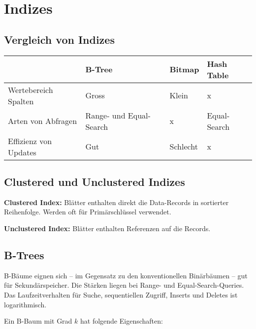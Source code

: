 \section{Indizes}


\subsection{Vergleich von Indizes}

\begin{tabular}{*4{l|}}
	\cline{2-4}
	& \textbf{B-Tree} & \textbf{Bitmap} & \textbf{Hash Table} \\
	\hline
	\multicolumn{1}{|l|}{Wertebereich Spalten} & Gross & Klein & x \\
	\multicolumn{1}{|l|}{Arten von Abfragen} & Range- und Equal-Search & x & Equal-Search \\
	\multicolumn{1}{|l|}{Effizienz von Updates} & Gut & Schlecht & x \\
	\hline
\end{tabular}


\subsection{Clustered und Unclustered Indizes}

\textbf{Clustered Index:} Blätter enthalten direkt die Data-Records in
sortierter Reihenfolge. Werden oft für Primärschlüssel verwendet.

\textbf{Unclustered Index:} Blätter enthalten Referenzen auf die Records.


\subsection{B-Trees}

B-Bäume eignen sich -- im Gegensatz zu den konventionellen Binärbäumen -- gut
für Sekundärspeicher. Die Stärken liegen bei Range- und Equal-Search-Queries.
Das Laufzeitverhalten für Suche, sequentiellen Zugriff, Inserts und Deletes
ist logarithmisch.

Ein B-Baum mit Grad $k$ hat folgende Eigenschaften:

